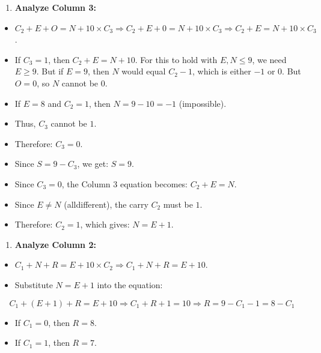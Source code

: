 \begin{enumerate}
  \item \textbf{Analyze Column 3:}
\end{enumerate}
\begin{itemize}
  \item   $C_2 + E + O = N + 10 \times C_3 \Rightarrow C_2 + E + 0 = N + 10 \times C_3 \Rightarrow C_2 + E = N + 10 \times C_3$.
  \item   If $C_3 = 1$, then $C_2 + E = N + 10$. For this to hold with $E, N \le 9$, we need $E \ge 9$. But if $E = 9$, then $N$ would equal $C_2 - 1$, which is either $-1$ or $0$. But $O=0$, so $N$ cannot be $0$.
  \item   If $E = 8$ and $C_2 = 1$, then $N = 9 - 10 = -1$ (impossible).
  \item   Thus, $C_3$ cannot be $1$.
  \item   Therefore: \textbf{$C_3 = 0$}.
  \item   Since $S = 9 - C_3$, we get: \textbf{$S = 9$}.
  \item   Since $C_3 = 0$, the Column 3 equation becomes: $C_2 + E = N$.
  \item   Since $E \ne N$ (alldifferent), the carry $C_2$ must be $1$.
  \item   Therefore: \textbf{$C_2 = 1$}, which gives: \textbf{$N = E + 1$}.
\end{itemize}

\begin{enumerate}
  \item \textbf{Analyze Column 2:}
\end{enumerate}
\begin{itemize}
  \item   $C_1 + N + R = E + 10 \times C_2 \Rightarrow C_1 + N + R = E + 10$.
  \item   Substitute $N = E + 1$ into the equation:
\end{itemize}
        \[ C_1 + (E + 1) + R = E + 10 \Rightarrow C_1 + R + 1 = 10 \Rightarrow R = 9 - C_1 - 1 = 8 - C_1 \]
\begin{itemize}
  \item   If $C_1 = 0$, then $R = 8$.
  \item   If $C_1 = 1$, then $R = 7$.
\end{itemize}

